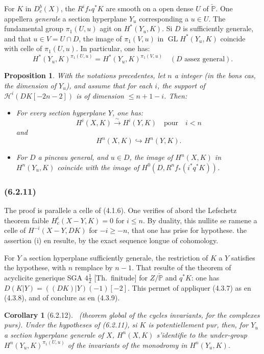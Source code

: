 \documentclass[12pt,a4paper]{article}
\theoremstyle{plain}
\newtheorem{proposition}[theorem]{Proposition}
\newtheorem{corollary}[theorem]{Corollary}
\theoremstyle{definition}
\theoremstyle{remark}
\DeclareMathOperator{\GL}{GL}
\newcommand{\bbP}{\mathbb{P}}
\newcommand{\scrH}{\mathscr{H}}
\begin{document}
For $K$ in $D_c^b(X)$, the $R^i f_* q^* K$ are smooth on a open dense $U$ of $\check{\bbP}$. One appellera \emph{generale} a section hyperplane $Y_u$ corresponding a $u \in U$. The fundamental group $\pi_1(U, u)$ agit on $H^*(Y_u, K)$. Si $D$ is sufficiently generale, and that $u \in V = U \cap D$, the image of $\pi_1(V, u)$ in $\GL H^*(Y_u, K)$ coincide with celle of $\pi_1(U, u)$. In particular, one has:
\begin{equation}
H^*(Y_u, K)^{\pi_1(U, u)} = H^*(Y_u, K)^{\pi_1(V, u)} \quad (D \text{ assez general}).
\end{equation}

\begin{proposition}
With the notations precedentes, let $n$ a integer (in the bons cas, the dimension of $Y_u$), and assume that for each $i$, the support of $\scrH^i(DK[-2n-2])$ is of dimension $\leq n + 1 - i$. Then:
\begin{itemize}
\item[(i)] For every section hyperplane $Y$, one has:
\[
H^i(X, K) \xrightarrow{\sim} H^i(Y, K) \quad \text{pour} \quad i < n
\]
and
\[
H^n(X, K) \hookrightarrow H^n(Y, K).
\]
\item[(ii)] For $D$ a pinceau general, and $u \in D$, the image of $H^n(X, K)$ in $H^n(Y_u, K)$ coincide with the image of $H^0(D, R^n f_*(i^* q^* K))$.
\end{itemize}
\end{proposition}

\subsubsection*{\textup{(6.2.11)}}

The proof is parallele a celle of (4.1.6). One verifies of abord the Lefschetz theorem faible $H_c^i(X - Y, K) = 0$ for $i \leq n$. By duality, this nullite se ramene a celle of $H^{-i}(X - Y, DK)$ for $-i \geq -n$, that one has prise for hypothese. the assertion (i) en resulte, by the exact sequence longue of cohomology.

For $Y$ a section hyperplane sufficiently generale, the restriction of $K$ a $Y$ satisfies the hypothese, with $n$ remplace by $n-1$. That resulte of the theorem of acyclicite generique SGA $4\frac{1}{2}$ [Th.~finitude] for $Z/\check{\bbP}$ and $q^* K$: one has $D(K|Y) = ((DK)|Y)(-1)[-2]$. This permet of appliquer (4.3.7) as en (4.3.8), and of conclure as en (4.3.9).

\begin{corollary}[6.2.12]\ \textup{(theorem global of the cycles invariants, for the complexes purs).}
Under the hypotheses of (6.2.11), si $K$ is potentiellement pur, then, for $Y_u$ a section hyperplane generale of $X$, $H^n(X, K)$ s'identifie to the under-group $H^n(Y_u, K)^{\pi_1(U, u)}$ of the invariants of the monodromy in $H^n(Y_u, K)$.
\end{corollary}
\end{document}
